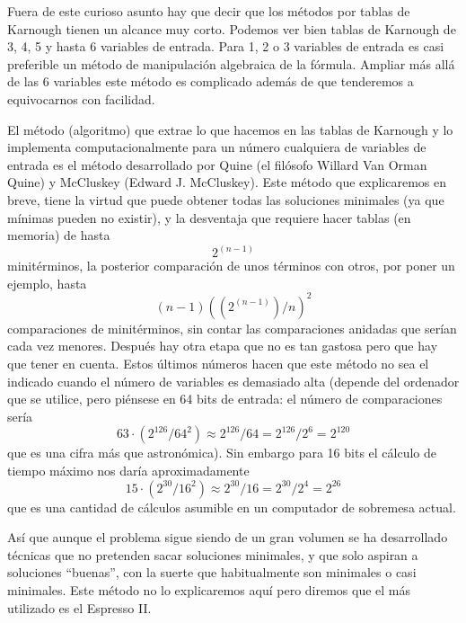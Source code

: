 \begin{enumerate}
\begin{enumerate}
\begin{enumerate}
\begin{enumerate}
        Fuera de este curioso asunto hay que decir que los métodos por
        tablas de Karnough tienen un alcance muy corto. Podemos ver bien
        tablas de Karnough de 3, 4, 5 y hasta 6 variables de entrada.
        Para 1, 2 o 3 variables de entrada es casi preferible un método
        de manipulación algebraica de la fórmula. Ampliar más allá de
        las 6 variables este método es complicado además de que
        tenderemos a equivocarnos con facilidad.

        El método (algoritmo) que extrae lo que hacemos en las tablas de
        Karnough y lo implementa computacionalmente para un número
        cualquiera de variables de entrada es el método desarrollado por
        Quine (el filósofo Willard Van Orman Quine) y McCluskey (Edward
        J. McCluskey). Este método que explicaremos en breve, tiene la
        virtud que puede obtener todas las soluciones minimales (ya que
        mínimas pueden no existir), y la desventaja que requiere hacer
        tablas (en memoria) de hasta \[2^{({n - 1})}\] minitérminos, la
        posterior comparación de unos términos con otros, por poner un
        ejemplo, hasta
        \[{({n - 1})}{({{(2^{({n - 1})})}/n})}^{2}\]comparaciones de
        minitérminos, sin contar las comparaciones anidadas que serían
        cada vez menores. Después hay otra etapa que no es tan gastosa
        pero que hay que tener en cuenta. Estos últimos números hacen
        que este método no sea el indicado cuando el número de variables
        es demasiado alta (depende del ordenador que se utilice, pero
        piénsese en 64 bits de entrada: el número de comparaciones
        sería\[{{{63 \cdot {({2^{126}/64^{2}})}} \approx {2^{126}/64}} = {2^{126}/2^{6}}} = 2^{120}\]que
        es una cifra más que astronómica). Sin embargo para 16 bits el
        cálculo de tiempo máximo nos daría aproximadamente
        \[{{{15 \cdot {({2^{30}/16^{2}})}} \approx {2^{30}/16}} = {2^{30}/2^{4}}} = 2^{26}\]que
        es una cantidad de cálculos asumible en un computador de
        sobremesa actual.

        Así que aunque el problema sigue siendo de un gran volumen se ha
        desarrollado técnicas que no pretenden sacar soluciones
        minimales, y que solo aspiran a soluciones ``buenas'', con la
        suerte que habitualmente son minimales o casi minimales. Este
        método no lo explicaremos aquí pero diremos que el más utilizado
        es el Espresso II.


\end{enumerate}
\end{enumerate}
\end{enumerate}
\end{enumerate}
